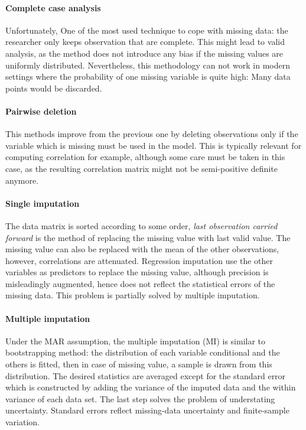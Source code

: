 \paragraph{Complete case analysis}
Unfortunately, One of the most used technique to cope with missing data: the
researcher only keeps observation that are complete. This might lead to valid
analysis, as the method does not introduce any bias if the missing values are
uniformly distributed. Nevertheless, this methodology can not work in modern
settings where the probability of one missing variable is quite high: Many data
points would be discarded.

\paragraph{Pairwise deletion}

This methods improve from the previous one by deleting observations only if the
variable which is missing must be used in the model. This is typically relevant
for computing correlation for example, although some care must be taken in this
case, as the resulting correlation matrix might not be semi-positive definite
anymore.

\paragraph{Single imputation}

The data matrix is sorted according to some order, \emph{last observation
  carried forward} is the method of replacing the missing value with last valid
value. The missing value can also be replaced with the mean of the other
observations, however, correlations are attenuated. Regression imputation use
the other variables as predictors to replace the missing value, although
precision is misleadingly augmented, hence does not reflect the statistical
errors of the missing data. This problem is partially solved by multiple
imputation.

\paragraph{Multiple imputation}

Under the MAR assumption, the multiple imputation (MI) is similar to
bootstrapping method: the distribution of each variable conditional and the
others is fitted, then in case of missing value, a sample is drawn from this
distribution. The desired statistics are averaged except for the standard error
which is constructed by adding the variance of the imputed data and the within
variance of each data set. The last step solves the problem of understating
uncertainty. Standard errors reflect missing-data uncertainty and finite-sample
variation.

